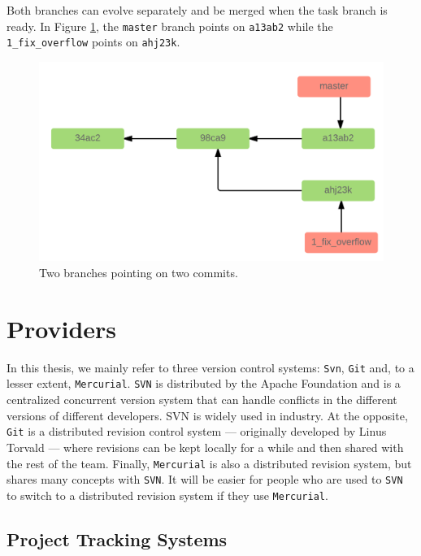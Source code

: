 \documentclass[12pt]{report}
\begin{document}
Both branches can evolve separately and be merged when the task branch
is ready. In Figure \ref{fig:merge}, the \lstinline!master! branch
points on \lstinline!a13ab2! while the \lstinline!1_fix_overflow! points
on \lstinline!ahj23k!.

\begin{figure}[h!]
  \centering
    \includegraphics[scale=0.25]{media/merge.png}
    \caption{Two branches pointing on two commits.
    \label{fig:merge}}
\end{figure}

\section{\texorpdfstring{Providers\label{sec:revision-provider}}{Providers}}\label{providers}

In this thesis, we mainly refer to three version control systems:
\lstinline!Svn!, \lstinline!Git! and, to a lesser extent,
\lstinline!Mercurial!. \lstinline!SVN! is distributed by the Apache
Foundation and is a centralized concurrent version system that can
handle conflicts in the different versions of different developers. SVN
is widely used in industry. At the opposite, \lstinline!Git! is a
distributed revision control system --- originally developed by Linus
Torvald --- where revisions can be kept locally for a while and then
shared with the rest of the team. Finally, \lstinline!Mercurial! is also
a distributed revision system, but shares many concepts with
\lstinline!SVN!. It will be easier for people who are used to
\lstinline!SVN! to switch to a distributed revision system if they use
\lstinline!Mercurial!.

\subsection{Project Tracking Systems\label{sec:issue-tracking}}
\end{document}
